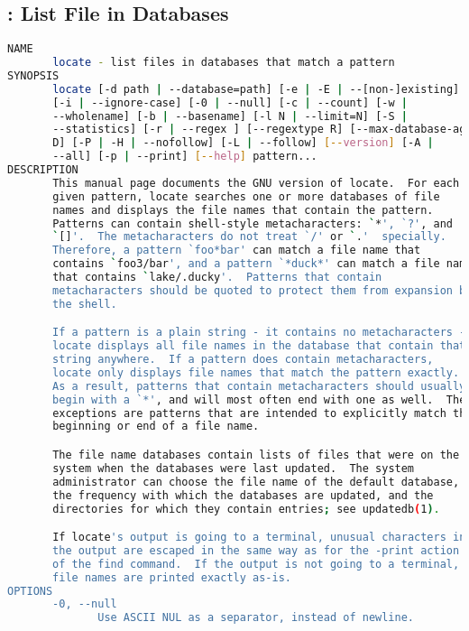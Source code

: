 % 
\subsection{: List File in Databases}

{\tiny{
\begin{lstlisting}[language=bash]
NAME
       locate - list files in databases that match a pattern
SYNOPSIS
       locate [-d path | --database=path] [-e | -E | --[non-]existing]
       [-i | --ignore-case] [-0 | --null] [-c | --count] [-w |
       --wholename] [-b | --basename] [-l N | --limit=N] [-S |
       --statistics] [-r | --regex ] [--regextype R] [--max-database-age
       D] [-P | -H | --nofollow] [-L | --follow] [--version] [-A |
       --all] [-p | --print] [--help] pattern...
DESCRIPTION
       This manual page documents the GNU version of locate.  For each
       given pattern, locate searches one or more databases of file
       names and displays the file names that contain the pattern.
       Patterns can contain shell-style metacharacters: `*', `?', and
       `[]'.  The metacharacters do not treat `/' or `.'  specially.
       Therefore, a pattern `foo*bar' can match a file name that
       contains `foo3/bar', and a pattern `*duck*' can match a file name
       that contains `lake/.ducky'.  Patterns that contain
       metacharacters should be quoted to protect them from expansion by
       the shell.

       If a pattern is a plain string - it contains no metacharacters -
       locate displays all file names in the database that contain that
       string anywhere.  If a pattern does contain metacharacters,
       locate only displays file names that match the pattern exactly.
       As a result, patterns that contain metacharacters should usually
       begin with a `*', and will most often end with one as well.  The
       exceptions are patterns that are intended to explicitly match the
       beginning or end of a file name.

       The file name databases contain lists of files that were on the
       system when the databases were last updated.  The system
       administrator can choose the file name of the default database,
       the frequency with which the databases are updated, and the
       directories for which they contain entries; see updatedb(1).

       If locate's output is going to a terminal, unusual characters in
       the output are escaped in the same way as for the -print action
       of the find command.  If the output is not going to a terminal,
       file names are printed exactly as-is.
OPTIONS
       -0, --null
              Use ASCII NUL as a separator, instead of newline.


\end{lstlisting}}}
